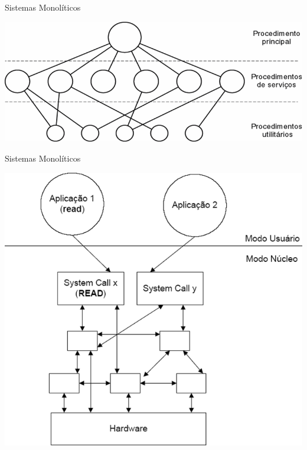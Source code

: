 \documentclass{beamer}
\begin{document}
\begin{frame}{Sistemas Monolíticos}

    \vspace{1cm}
    \begin{center}
        \includegraphics[width=0.9\linewidth]{assets/aula-tads-sope/SO-monolitico-1.png} %
    \end{center}
\end{frame}
\begin{frame}{Sistemas Monolíticos}

    \vspace{1cm}
    \begin{center}
        \includegraphics[width=0.45\linewidth]{assets/aula-tads-sope/SO-monolitico-2.png} %
    \end{center}
\end{frame}
\end{document}
